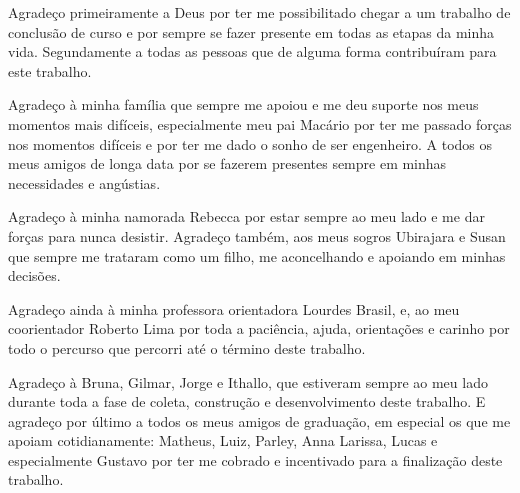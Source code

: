 \begin{agradecimentos}
    Agradeço primeiramente a Deus por ter me possibilitado chegar a um trabalho de conclusão de curso e por sempre se fazer presente em todas as etapas da minha vida. Segundamente a todas as pessoas que de alguma forma contribuíram para este trabalho.

    Agradeço à minha família que sempre me apoiou e me deu suporte nos meus momentos mais difíceis, especialmente meu pai Macário por ter me passado forças nos momentos difíceis e por ter me dado o sonho de ser engenheiro. A todos os meus amigos de longa data por se fazerem presentes sempre em minhas necessidades e angústias. 

    Agradeço à minha namorada Rebecca por estar sempre ao meu lado e me dar forças para nunca desistir. Agradeço também, aos meus sogros Ubirajara e Susan que sempre me trataram como um filho, me aconcelhando e apoiando em minhas decisões. 

    Agradeço ainda à minha professora orientadora Lourdes Brasil, e, ao meu coorientador Roberto Lima por toda a paciência, ajuda, orientações e carinho por todo o percurso que percorri até o término deste trabalho. 

    Agradeço à Bruna, Gilmar, Jorge e Ithallo, que estiveram sempre ao meu lado durante toda a fase de coleta, construção e desenvolvimento deste trabalho. E agradeço por último a todos os meus amigos de graduação, em especial os que me apoiam cotidianamente: Matheus, Luiz, Parley, Anna Larissa, Lucas e especialmente Gustavo por ter me cobrado e incentivado para a finalização deste trabalho.
\end{agradecimentos}
